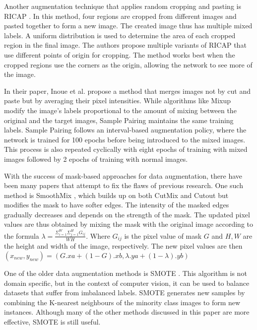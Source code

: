 Another augmentation technique that applies random cropping and pasting is RICAP \cite{takahashiDataAugmentationUsing2020}. In this method, four regions are cropped from different images and pasted together to form a new image. The created image thus has multiple mixed labels. A uniform distribution is used to determine the area of each cropped region in the final image. The authors propose multiple variants of RICAP that use different points of origin for cropping. The method works best when the cropped regions use the corners as the origin, allowing the network to see more of the image.

In their paper, Inoue et al. propose a method that merges images not by cut and paste but by averaging their pixel intensities. While algorithms like Mixup \cite{zhangMixupEmpiricalRisk2018} modify the image's labels proportional to the amount of mixing between the original and the target images, Sample Pairing \cite{inoueDataAugmentationPairing2018} maintains the same training labels. Sample Pairing follows an interval-based augmentation policy, where the network is trained for 100 epochs before being introduced to the mixed images. This process is also repeated cyclically with eight epochs of training with mixed images followed by 2 epochs of training with normal images.

With the success of mask-based approaches for data augmentation, there have been many papers that attempt to fix the flaws of previous research. One such method is SmoothMix \cite{leeSmoothMixSimpleEffective2020}, which builds up on both CutMix \cite{yunCutMixRegularizationStrategy2019} and Cutout \cite{devriesImprovedRegularizationConvolutional2017} but modifies the mask to have softer edges. The intensity of the masked edges gradually decreases and depends on the strength of the mask. The updated pixel values are thus obtained by mixing the mask with the original image according to the formula $\lambda= \frac{\Sigma_{i=1}^{W}\Sigma_{j=1}^{H}G_{ij}}{WH}$. Where $G_{ij}$ is the pixel value of mask $G$ and $H,W$ are the height and width of the image, respectively. The new pixel values are then $(x_{new} , y_{new}) = (G.xa + (1 - G).xb , \lambda.ya + (1 - \lambda).yb)$

One of the older data augmentation methods is SMOTE \cite{SMOTESyntheticMinority}. This algorithm is not domain specific, but in the context of computer vision, it can be used to balance datasets that suffer from imbalanced labels. SMOTE generates new samples by combining the K-nearest neighbours of the minority class images to form new instances. Although many of the other methods discussed in this paper are more effective, SMOTE is still useful.

